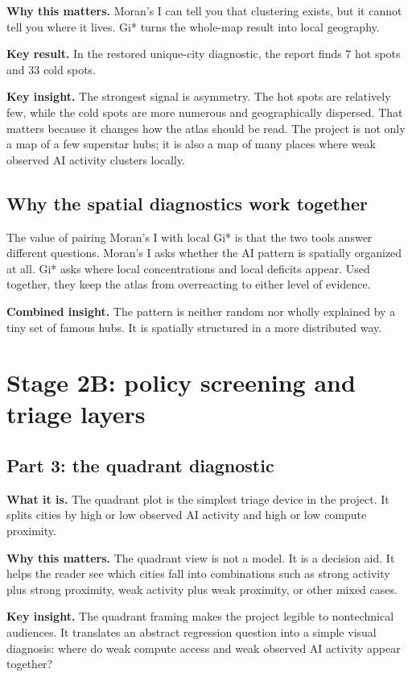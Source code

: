 \documentclass[11pt]{article}
\begin{document}
\textbf{Why this matters.} Moran's I can tell you that clustering exists, but it cannot tell you where it lives. Gi* turns the whole-map result into local geography.

\textbf{Key result.} In the restored unique-city diagnostic, the report finds 7 hot spots and 33 cold spots.

\textbf{Key insight.} The strongest signal is asymmetry. The hot spots are relatively few, while the cold spots are more numerous and geographically dispersed. That matters because it changes how the atlas should be read. The project is not only a map of a few superstar hubs; it is also a map of many places where weak observed AI activity clusters locally.

\subsection{Why the spatial diagnostics work together}
The value of pairing Moran's I with local Gi* is that the two tools answer different questions. Moran's I asks whether the AI pattern is spatially organized at all. Gi* asks where local concentrations and local deficits appear. Used together, they keep the atlas from overreacting to either level of evidence.

\textbf{Combined insight.} The pattern is neither random nor wholly explained by a tiny set of famous hubs. It is spatially structured in a more distributed way.

\section{Stage 2B: policy screening and triage layers}

\subsection{Part 3: the quadrant diagnostic}
\textbf{What it is.} The quadrant plot is the simplest triage device in the project. It splits cities by high or low observed AI activity and high or low compute proximity.

\textbf{Why this matters.} The quadrant view is not a model. It is a decision aid. It helps the reader see which cities fall into combinations such as strong activity plus strong proximity, weak activity plus weak proximity, or other mixed cases.

\textbf{Key insight.} The quadrant framing makes the project legible to nontechnical audiences. It translates an abstract regression question into a simple visual diagnosis: where do weak compute access and weak observed AI activity appear together?
\end{document}

